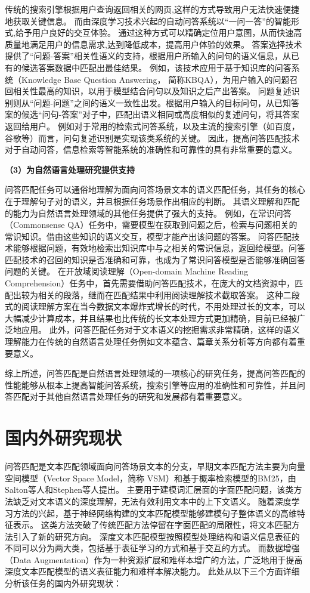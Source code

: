 传统的搜索引擎根据用户查询返回相关的网页,这样的方式导致用户无法快速便捷地获取关键信息。
而由深度学习技术兴起的自动问答系统以“一问一答”的智能形式,给予用户良好的交互体验。
通过这种方式可以精确定位用户意图，从而快速高质量地满足用户的信息需求,达到降低成本，提高用户体验的效果。
答案选择技术提供了“问题-答案”相关性语义的支持，根据用户所输入的问句的语义信息，从已有的候选答案数据中匹配出最佳结果。
例如，该技术应用于基于知识库的问答系统（Knowledge Base Question Answering， 简称KBQA），为用户输入的问题召回相关性最高的知识，以用于模型结合问句以及知识之后产出答案。
问题复述识别则从“问题-问题”之间的语义一致性出发。根据用户输入的目标问句，从已知答案的候选“问句-答案”对子中，匹配出语义相同或高度相似的复述问句，将其答案返回给用户。
例如对于常用的检索式问答系统，以及主流的搜索引擎（如百度，谷歌等）而言，问句复述识别是实现该类系统的关键。
因此，提高问答匹配技术对于自动问答，信息检索等智能系统的准确性和可靠性的具有非常重要的意义。


\textbf{\songti（3）为自然语言处理研究提供支持}

问答匹配任务可以通俗地理解为面向问答场景文本的语义匹配任务，其任务的核心在于理解句子对的语义，并且根据任务场景作出相应的判断。
其语义理解和匹配的能力为自然语言处理领域的其他任务提供了强大的支持。
例如，在常识问答（Commonsense QA）任务中，需要模型在获取到问题之后，检索与问题相关的常识知识。借由这些知识的语义交互，模型才能产出该问题的答案。
问答匹配技术能够根据问题，有效地检索出知识库中与之相关的常识信息，返回给模型。问答匹配技术的召回的知识是否准确和可靠，也成为了常识问答模型是否能够准确回答问题的关键。
在开放域阅读理解（Open-domain Machine Reading Comprehension）任务中，首先需要借助问答匹配技术，在庞大的文档资源中，匹配出较为相关的段落，继而在匹配结果中利用阅读理解技术截取答案。
这种二段式的阅读理解方案在当今数据文本爆炸式增长的时代，不用处理过长的文本，可以大幅减少计算成本，并且结果也比传统的长文本处理方式更加精确，目前已经被广泛地应用。
此外，问答匹配任务对于文本语义的挖掘需求非常精确，这样的语义理解能力在传统的自然语言处理任务例如文本蕴含、篇章关系分析等方向都有着重要意义。

综上所述，问答匹配是自然语言处理领域的一项核心的研究任务，提高问答匹配的性能能够从根本上提高智能问答系统，搜索引擎等应用的准确性和可靠性，并且问答匹配对于其他自然语言处理任务的研究和发展都有着重要意义。

\section{国内外研究现状}

问答匹配是文本匹配领域面向问答场景文本的分支，早期文本匹配方法主要为向量空间模型（Vector Space Model，简称 VSM）\cite{salton1975vector}和基于概率检索模型的BM25\cite{robertson1994some}，由Salton等人和Stephen等人提出。
主要用于建模词汇层面的字面匹配问题，该类方法缺乏对文本语义的深度理解，无法有效利用文本中的上下文语义。
随着深度学习方法的兴起，基于神经网络构建的文本匹配模型能够建模句子整体语义的高维特征表示。
这类方法突破了传统匹配方法停留在字面匹配的局限性，将文本匹配方法引入了新的研究方向。
深度文本匹配模型按照模型处理结构和语义信息表征的不同可以分为两大类，包括基于表征学习的方式和基于交互的方式。
而数据增强（Data Augmentation）作为一种资源扩展和难样本增广的方法，广泛地用于提高深度文本匹配模型的语义表征能力和难样本解决能力。
此处从以下三个方面详细分析该任务的国内外研究现状：

